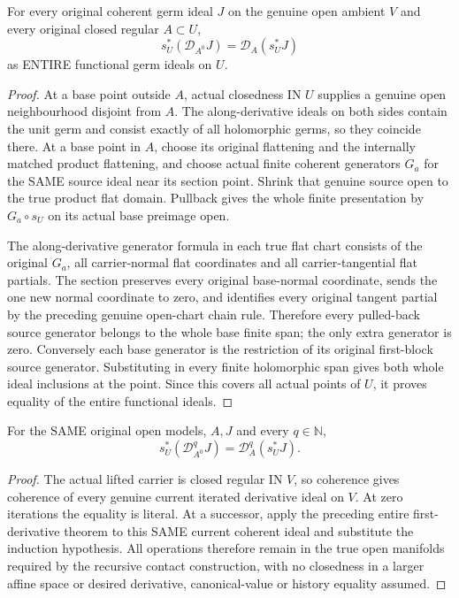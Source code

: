 \begin{theorem}
\label{hir:actual-open-zero-section-whole-derivative}
\leanok
For every original coherent germ ideal $J$ on the genuine open ambient $V$ and every original closed regular $A\subset U$,
\[
 s_U^*(\mathcal D_{A^0}J)=\mathcal D_A(s_U^*J)
\]
as ENTIRE functional germ ideals on $U$.
\end{theorem}
\begin{proof}
At a base point outside $A$, actual closedness IN $U$ supplies a genuine open neighbourhood disjoint from $A$. The along-derivative ideals on both sides contain the unit germ and consist exactly of all holomorphic germs, so they coincide there. At a base point in $A$, choose its original flattening and the internally matched product flattening, and choose actual finite coherent generators $G_a$ for the SAME source ideal near its section point. Shrink that genuine source open to the true product flat domain. Pullback gives the whole finite presentation by $G_a\circ s_U$ on its actual base preimage open.

The along-derivative generator formula in each true flat chart consists of the original $G_a$, all carrier-normal flat coordinates and all carrier-tangential flat partials. The section preserves every original base-normal coordinate, sends the one new normal coordinate to zero, and identifies every original tangent partial by the preceding genuine open-chart chain rule. Therefore every pulled-back source generator belongs to the whole base finite span; the only extra generator is zero. Conversely each base generator is the restriction of its original first-block source generator. Substituting in every finite holomorphic span gives both whole ideal inclusions at the point. Since this covers all actual points of $U$, it proves equality of the entire functional ideals.
\end{proof}

\begin{theorem}
\label{hir:actual-open-zero-section-whole-iterated-derivative}
\leanok
For the SAME original open models, $A,J$ and every $q\in\mathbb N$,
\[
 s_U^*(\mathcal D_{A^0}^{q}J)=\mathcal D_A^{q}(s_U^*J).
\]
\end{theorem}
\begin{proof}
The actual lifted carrier is closed regular IN $V$, so coherence gives coherence of every genuine current iterated derivative ideal on $V$. At zero iterations the equality is literal. At a successor, apply the preceding entire first-derivative theorem to this SAME current coherent ideal and substitute the induction hypothesis. All operations therefore remain in the true open manifolds required by the recursive contact construction, with no closedness in a larger affine space or desired derivative, canonical-value or history equality assumed.
\end{proof}
